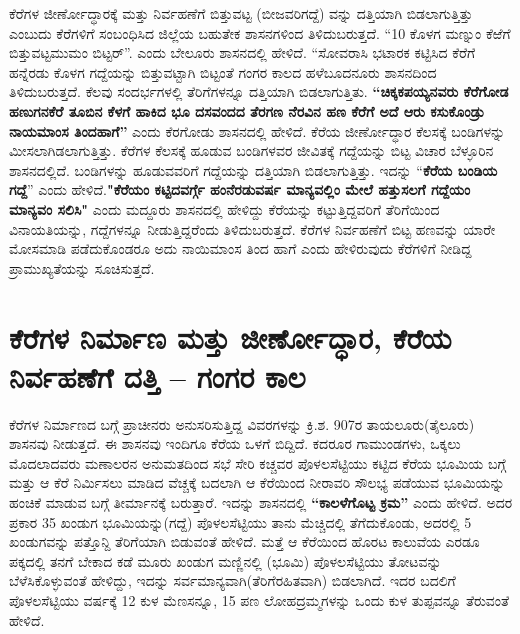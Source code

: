 ಕೆರೆಗಳ ಜೀರ್ಣೋದ್ಧಾರಕ್ಕೆ ಮತ್ತು ನಿರ್ವಹಣೆಗೆ ಬಿತ್ತುವಟ್ಟ (ಬೀಜವರಿಗದ್ದೆ) ವನ್ನು ದತ್ತಿಯಾಗಿ ಬಿಡಲಾಗುತ್ತಿತ್ತು ಎಂಬುದು ಕೆರೆಗಳಿಗೆ ಸಂಬಂಧಿಸಿದ ಜಿಲ್ಲೆಯ ಬಹುತೇಕ ಶಾಸನಗಳಿಂದ ತಿಳಿದುಬರುತ್ತದೆ. “10 ಕೊಳಗ ಮಣ್ನುಂ ಕೆಱೆಗೆ ಬಿತ್ತುವಟ್ಟಮುಮಂ ಬಿಟ್ಟರ್​”. ಎಂದು ಬೇಲೂರು ಶಾಸನದಲ್ಲಿ ಹೇಳಿದೆ. “ಸೋವರಾಸಿ ಭಟಾರಕ ಕಟ್ಟಿಸಿದ ಕೆರೆಗೆ ಹನ್ನೆರಡು ಕೊಳಗ ಗದ್ದೆಯನ್ನು ಬಿತ್ತುವಟ್ಟಾಗಿ ಬಿಟ್ಟಂತೆ ಗಂಗರ ಕಾಲದ ಹಳೆಬೂದನೂರು ಶಾಸನದಿಂದ ತಿಳಿದುಬರುತ್ತದೆ. ಕೆಲವು ಸಂದರ್ಭಗಳಲ್ಲಿ ತೆರಿಗೆಗಳನ್ನೂ ದತ್ತಿಯಾಗಿ ಬಿಡಲಾಗುತ್ತಿತು. \textbf{“ಚಿಕ್ಕಕಪಯ್ಯನವರು ಕೆರೆಗೋಡ ಹಣುಗನಕೆರೆ ತೂಬಿನ ಕೆಳಗೆ ಹಾಕಿದ ಭೂ ದಸವಂದದ ತೆರಗಣ ನೆರವಿನ ಹಣ ಕೆರೆಗೆ ಅದೆ ಆರು ಕಸುಕೊಂಡ್ರು ನಾಯಮಾಂಸ ತಿಂದಹಾಗೆ”} ಎಂದು ಕೆರಗೋಡು ಶಾಸನದಲ್ಲಿ ಹೇಳಿದೆ. ಕೆರೆಯ ಜೀರ್ಣೋದ್ಧಾರ ಕೆಲಸಕ್ಕೆ ಬಂಡಿಗಳನ್ನು ಮೀಸಲಾಗಿಡಲಾಗುತ್ತಿತ್ತು. ಕೆರೆಗಳ ಕೆಲಸಕ್ಕೆ ಹೂಡುವ ಬಂಡಿಗಳವರ ಜೀವಿತಕ್ಕೆ ಗದ್ದೆಯನ್ನು ಬಿಟ್ಟ ವಿಚಾರ ಬೆಳ್ಳೂರಿನ ಶಾಸನದಲ್ಲಿದೆ. ಬಂಡಿಗಳನ್ನು ಹೂಡುವವರಿಗೆ ಗದ್ದೆಯನ್ನು ದತ್ತಿಯಾಗಿ ಬಿಡಲಾಗುತ್ತಿತ್ತು. ಇದನ್ನು “\textbf{ಕೆರೆಯ ಬಂಡಿಯ ಗದ್ದೆ}” ಎಂದು ಹೇಳಿದೆ.\textbf{"ಕೆರೆಯಂ ಕಟ್ಟಿದವರ್ಗ್ಗೆ ಹಂನೆರಡುವರ್ಷ ಮಾನ್ಯವಲ್ಲಿಂ ಮೇಲೆ ಹತ್ತುಸಲಗೆ ಗದ್ದೆಯಂ ಮಾನ್ಯವಂ ಸಲಿಸಿ"} ಎಂದು ಮದ್ದೂರು ಶಾಸನದಲ್ಲಿ ಹೇಳಿದ್ದು ಕೆರೆಯನ್ನು ಕಟ್ಟುತ್ತಿದ್ದವರಿಗೆ ತೆರಿಗೆಯಿಂದ ವಿನಾಯತಿಯನ್ನು, ಗದ್ದೆಗಳನ್ನೂ ನೀಡುತ್ತಿದ್ದರೆಂದು ತಿಳಿದುಬರುತ್ತದೆ. ಕೆರೆಗಳ ನಿರ್ವಹಣೆಗೆ ಬಿಟ್ಟ ಹಣವನ್ನು ಯಾರೇ ಮೋಸಮಾಡಿ ಪಡೆದುಕೊಂಡರೂ ಅದು ನಾಯಿಮಾಂಸ ತಿಂದ ಹಾಗೆ ಎಂದು ಹೇಳಿರುವುದು ಕೆರೆಗಳಿಗೆ ನೀಡಿದ್ದ ಪ್ರಾಮುಖ್ಯತೆಯನ್ನು ಸೂಚಿಸುತ್ತದೆ.


\section*{ಕೆರೆಗಳ ನಿರ್ಮಾಣ ಮತ್ತು ಜೀರ್ಣೋದ್ಧಾರ, ಕೆರೆಯ ನಿರ್ವಹಣೆಗೆ ದತ್ತಿ – ಗಂಗರ ಕಾಲ}

ಕೆರೆಗಳ ನಿರ್ಮಾಣದ ಬಗ್ಗೆ ಪ್ರಾಚೀನರು ಅನುಸರಿಸುತ್ತಿದ್ದ ವಿವರಗಳನ್ನು ಕ್ರಿ.ಶ. 907ರ ತಾಯಲೂರು(ತೈಲೂರು) ಶಾಸನವು ನೀಡುತ್ತದೆ. ಈ ಶಾಸನವು ಇಂದಿಗೂ ಕೆರೆಯ ಒಳಗೆ ಬಿದ್ದಿದೆ. ಕದರೂರ ಗಾಮುಂಡಗಳು, ಒಕ್ಕಲು ಮೊದಲಾದವರು ಮಣಾಲರನ ಅನುಮತದಿಂದ ಸಭೆ ಸೇರಿ ಕಚ್ಚವರ ಪೊಳಲಸೆಟ್ಟಿಯು ಕಟ್ಟಿದ ಕೆರೆಯ ಭೂಮಿಯ ಬಗ್ಗೆ ಮತ್ತು ಆ ಕೆರೆ ನಿರ್ಮಿಸಲು ಮಾಡಿದ ವೆಚ್ಚಕ್ಕೆ ಬದಲಾಗಿ ಆ ಕೆರೆಯಿಂದ ನೀರಾವರಿ ಸೌಲಭ್ಯ ಪಡೆಯುವ ಭೂಮಿಯನ್ನು ಹಂಚಿಕೆ ಮಾಡುವ ಬಗ್ಗೆ ತೀರ್ಮಾನಕ್ಕೆ ಬರುತ್ತಾರೆ. ಇದನ್ನು ಶಾಸನದಲ್ಲಿ \textbf{“ಕಾಲಳೆಗೊಟ್ಟ ಕ್ರಮ”} ಎಂದು ಹೇಳಿದೆ. ಅದರ ಪ್ರಕಾರ 35 ಖಂಡುಗ ಭೂಮಿಯನ್ನು(ಗದ್ದೆ) ಪೊಳಲಸೆಟ್ಟಿಯು ತಾನು ಮೆಚ್ಚಿದಲ್ಲಿ ತೆಗೆದುಕೊಂಡು, ಅದರಲ್ಲಿ 5 ಖಂಡುಗವನ್ನು ಪತ್ತೊನ್ದಿ ತೆರಿಗೆಯಾಗಿ ಬಿಡುವಂತೆ ಹೇಳಿದೆ. ಮತ್ತೆ ಆ ಕೆರೆಯಿಂದ ಹೊರಟ ಕಾಲುವೆಯ ಎರಡೂ ಪಕ್ಕದಲ್ಲಿ ತನಗೆ ಬೇಕಾದ ಕಡೆ ಮೂರು ಖಂಡುಗ ಮಣ್ಣಿನಲ್ಲಿ (ಭೂಮಿ) ಪೊಳಲಸೆಟ್ಟಿಯು ತೋಟವನ್ನು ಬೆಳೆಸಿಕೊಳ್ಳುವಂತೆ ಹೇಳಿದ್ದು, ಇದನ್ನು ಸರ್ವಮಾನ್ಯವಾಗಿ(ತೆರಿಗೆರಹಿತವಾಗಿ) ಬಿಡಲಾಗಿದೆ. ಇದರ ಬದಲಿಗೆ ಪೊಳಲಸೆಟ್ಟಿಯು ವರ್ಷಕ್ಕೆ 12 ಕುಳ ಮೆಣಸನ್ನೂ, 15 ಪಣ ಲೋಹದ್ರಮ್ಮಗಳನ್ನು ಒಂದು ಕುಳ ತುಪ್ಪವನ್ನೂ ತೆರುವಂತೆ ಹೇಳಿದೆ.

